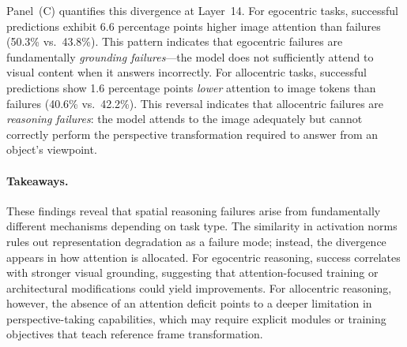 Panel~(C) quantifies this divergence at Layer~14. For egocentric tasks, successful predictions exhibit 6.6 percentage points higher image attention than failures (50.3\% vs.\ 43.8\%). This pattern indicates that egocentric failures are fundamentally \textit{grounding failures}---the model does not sufficiently attend to visual content when it answers incorrectly. For allocentric tasks, successful predictions show 1.6 percentage points \textit{lower} attention to image tokens than failures (40.6\% vs.\ 42.2\%). This reversal indicates that allocentric failures are \textit{reasoning failures}: the model attends to the image adequately but cannot correctly perform the perspective transformation required to answer from an object's viewpoint.

\paragraph{Takeaways.}

These findings reveal that spatial reasoning failures arise from fundamentally different mechanisms depending on task type. The similarity in activation norms rules out representation degradation as a failure mode; instead, the divergence appears in how attention is allocated. For egocentric reasoning, success correlates with stronger visual grounding, suggesting that attention-focused training or architectural modifications could yield improvements. For allocentric reasoning, however, the absence of an attention deficit points to a deeper limitation in perspective-taking capabilities, which may require explicit modules or training objectives that teach reference frame transformation.
